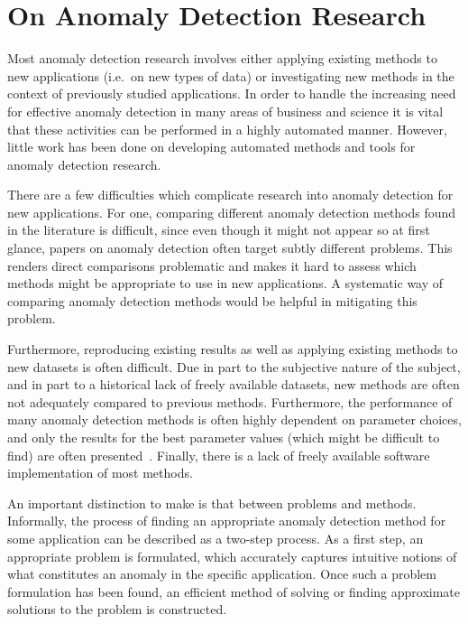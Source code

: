 \section{On Anomaly Detection Research}
\label{sect:on_ad_research}

Most anomaly detection research involves either applying existing methods to new applications (i.e.\ on new types of data) or investigating new methods in the context of previously studied applications. In order to handle the increasing need for effective anomaly detection in many areas of business and science it is vital that these activities can be performed in a highly automated manner. However, little work has been done on developing automated methods and tools for anomaly detection research.

There are a few difficulties which complicate research into anomaly detection for new applications. For one, comparing different anomaly detection methods found in the literature is difficult, since even though it might not appear so at first glance, papers on anomaly detection often target subtly different problems. This renders direct comparisons problematic and makes it hard to assess which methods might be appropriate to use in new applications. A systematic way of comparing anomaly detection methods would be helpful in mitigating this problem.

Furthermore, reproducing existing results as well as applying existing methods to new datasets is often difficult. Due in part to the subjective nature of the subject, and in part to a historical lack of freely available datasets, new methods are often not adequately compared to previous methods. Furthermore, the performance of many anomaly detection methods is often highly dependent on parameter choices, and only the results for the best parameter values (which might be difficult to find) are often presented~\cite{keogh5}. Finally, there is a lack of freely available software implementation of most methods.

An important distinction to make is that between problems and methods. Informally, the process of finding an appropriate anomaly detection method for some application can be described as a two-step process. As a first step, an appropriate problem is formulated, which accurately captures intuitive notions of what constitutes an anomaly in the specific application. Once such a problem formulation has been found, an efficient method of solving or finding approximate solutions to the problem is constructed.

